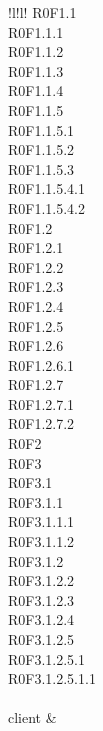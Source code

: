 \begin{tabella}{!{\VRule}l!{\VRule}l!{\VRule}}
{					R0F1.1 \\
					R0F1.1.1 \\
					R0F1.1.2 \\
					R0F1.1.3 \\
					R0F1.1.4 \\
					R0F1.1.5 \\ 
					R0F1.1.5.1 \\
					R0F1.1.5.2 \\
					R0F1.1.5.3 \\
					R0F1.1.5.4.1 \\
					R0F1.1.5.4.2 \\
					R0F1.2 \\
					R0F1.2.1 \\
					R0F1.2.2 \\
					R0F1.2.3 \\
					R0F1.2.4 \\ 
					R0F1.2.5 \\
					R0F1.2.6 \\
					R0F1.2.6.1 \\
					R0F1.2.7 \\
					R0F1.2.7.1 \\ 
					R0F1.2.7.2 \\
					R0F2 \\
					R0F3 \\
					R0F3.1 \\
					R0F3.1.1 \\
					R0F3.1.1.1 \\
					R0F3.1.1.2 \\
					R0F3.1.2 \\
					R0F3.1.2.2 \\
					R0F3.1.2.3 \\
					R0F3.1.2.4 \\
					R0F3.1.2.5 \\
					R0F3.1.2.5.1 \\
					R0F3.1.2.5.1.1 \\
					
				} \\
				
	client & \cellacaporiga{
					
}
\end{tabella}
